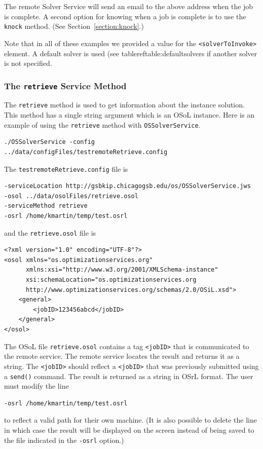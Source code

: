 \documentclass[11pt]{article}
\renewcommand{\_}{{\char"5F}}
\renewcommand{\{}{{\char"7B}}
\renewcommand{\}}{{\char"7D}}
\renewcommand{\^}{{\char"0D}}
\renewcommand{\'}{{\char"0D}}
\begin{document}
\begin{enumerate}[Step 1:]
The remote Solver Service will send an email to the above address when the job is complete. A second option for
knowing when a job is complete is to use the {\tt knock} method.
(See Section~\ref{section:knock}.)

Note that in all of these examples we provided a value for the {\tt <solverToInvoke>} element.
A default solver is used (see tableref{table:defaultsolvers} if another solver is not specified.%



\subsubsection{The  {\tt retrieve} Service Method}\label{section:retrieve}

The {\tt retrieve} method is used to get information about the instance solution.  This method has a single string argument which is an OSoL instance. Here is an example of using the {\tt retrieve} method with {\tt OSSolverService}.
\begin{verbatim}
./OSSolverService -config ../data/configFiles/testremoteRetrieve.config
\end{verbatim}
The {\tt testremoteRetrieve.config} file is
\begin{verbatim}
-serviceLocation http://gsbkip.chicagogsb.edu/os/OSSolverService.jws
-osol ../data/osolFiles/retrieve.osol
-serviceMethod retrieve
-osrl /home/kmartin/temp/test.osrl
\end{verbatim}
and the {\tt retrieve.osol} file is

\begin{verbatim}
<?xml version="1.0" encoding="UTF-8"?>
<osol xmlns="os.optimizationservices.org"
      xmlns:xsi="http://www.w3.org/2001/XMLSchema-instance"
      xsi:schemaLocation="os.optimizationservices.org
      http://www.optimizationservices.org/schemas/2.0/OSiL.xsd">
    <general>
        <jobID>123456abcd</jobID>
    </general>
</osol>
\end{verbatim}

The OSoL file {\tt retrieve.osol} contains a tag {\tt <jobID>} that is communicated to
the remote service. The remote service locates the result and returns it as a string.
The {\tt <jobID>} should reflect a {\tt <jobID>} that was previously submitted
using a {\tt send()} command.
The result is returned as a string in OSrL format.  The user must modify the line
\begin{verbatim}
-osrl /home/kmartin/temp/test.osrl
\end{verbatim}
to reflect a valid path for their own machine.  (It is also possible to delete the line
in which case the result will be displayed on the screen instead of being saved to the
file indicated in the {\tt -osrl} option.)



\end{enumerate}
\end{document}
